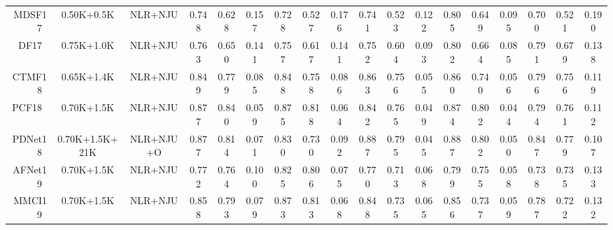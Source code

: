 \documentclass[journal]{IEEEtran}
\begin{document}
\begin{table*}[t]
{\begin{tabular}{r|cc|ccc|ccc|ccc|ccc|ccc}
    \midrule
    MDSF17~\cite{song2017depth} & \multicolumn{1}{c}{0.50K+0.5K} & NLR+NJU & \multicolumn{1}{c}{0.748} & \multicolumn{1}{c}{0.628} & 0.157 & \multicolumn{1}{c}{0.728} & \multicolumn{1}{c}{0.527} & 0.176 & \multicolumn{1}{c}{0.741} & \multicolumn{1}{c}{0.523} & 0.122 & \multicolumn{1}{c}{0.805} & \multicolumn{1}{c}{0.649} & 0.095 & \multicolumn{1}{c}{0.700} & 0.521 & 0.190 \\
    DF17~\cite{TIP_Q2017}  & \multicolumn{1}{c}{0.75K+1.0K} & NLR+NJU & \multicolumn{1}{c}{0.763} & \multicolumn{1}{c}{0.650} & 0.141 & \multicolumn{1}{c}{0.757} & \multicolumn{1}{c}{0.617} & 0.141 & \multicolumn{1}{c}{0.752} & \multicolumn{1}{c}{0.604} & 0.093 & \multicolumn{1}{c}{0.802} & \multicolumn{1}{c}{0.664} & 0.085 & \multicolumn{1}{c}{0.791} & 0.679 & 0.138 \\
    CTMF18~\cite{han2017cnns} & \multicolumn{1}{c}{0.65K+1.4K} & NLR+NJU & \multicolumn{1}{c}{0.849} & \multicolumn{1}{c}{0.779} & 0.085 & \multicolumn{1}{c}{0.848} & \multicolumn{1}{c}{0.758} & 0.086 & \multicolumn{1}{c}{0.863} & \multicolumn{1}{c}{0.756} & 0.055 & \multicolumn{1}{c}{0.860} & \multicolumn{1}{c}{0.740} & 0.056 & \multicolumn{1}{c}{0.796} & 0.756 & 0.119 \\
    PCF18~\cite{chen2018progressively} & \multicolumn{1}{c}{0.70K+1.5K} & NLR+NJU & \multicolumn{1}{c}{0.877} & \multicolumn{1}{c}{0.840} & 0.059 & \multicolumn{1}{c}{0.875} & \multicolumn{1}{c}{0.818} & 0.064 & \multicolumn{1}{c}{0.842} & \multicolumn{1}{c}{0.765} & 0.049 & \multicolumn{1}{c}{0.874} & \multicolumn{1}{c}{0.802} & 0.044 & \multicolumn{1}{c}{0.794} & 0.761 & 0.112 \\
    PDNet18~\cite{Zhu2018PDNet} & \multicolumn{1}{c}{0.70K+1.5K+21K} & NLR+NJU+O & \multicolumn{1}{c}{0.877} & \multicolumn{1}{c}{0.814} & 0.071 & \multicolumn{1}{c}{0.830} & \multicolumn{1}{c}{0.730} & 0.092 & \multicolumn{1}{c}{0.887} & \multicolumn{1}{c}{0.795} & 0.045 & \multicolumn{1}{c}{0.887} & \multicolumn{1}{c}{0.802} & 0.050 & \multicolumn{1}{c}{0.847} & 0.779 & 0.107 \\
    AFNet19~\cite{wang2019adaptive} & \multicolumn{1}{c}{0.70K+1.5K} & NLR+NJU & \multicolumn{1}{c}{0.772} & \multicolumn{1}{c}{0.764} & 0.100 & \multicolumn{1}{c}{0.825} & \multicolumn{1}{c}{0.806} & 0.075 & \multicolumn{1}{c}{0.770} & \multicolumn{1}{c}{0.713} & 0.068 & \multicolumn{1}{c}{0.799} & \multicolumn{1}{c}{0.755} & 0.058 & \multicolumn{1}{c}{0.738} & 0.735 & 0.133 \\
    MMCI19~\cite{chen2019multi} & \multicolumn{1}{c}{0.70K+1.5K} & NLR+NJU & \multicolumn{1}{c}{0.858} & \multicolumn{1}{c}{0.793} & 0.079 & \multicolumn{1}{c}{0.873} & \multicolumn{1}{c}{0.813} & 0.068 & \multicolumn{1}{c}{0.848} & \multicolumn{1}{c}{0.735} & 0.065 & \multicolumn{1}{c}{0.856} & \multicolumn{1}{c}{0.737} & 0.059 & \multicolumn{1}{c}{0.787} & 0.722 & 0.132 \\

\end{tabular}}
\end{table*}
\end{document}
